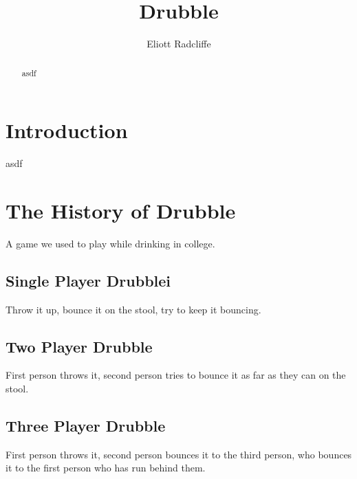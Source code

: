\documentclass{amsart}
\numberwithin{equation}{section}
\begin{document}
\title{Drubble}

\author{Eliott Radcliffe}



\begin{abstract}
asdf
\end{abstract}

\maketitle

\section{Introduction}
asdf

\section{The History of Drubble}
A game we used to play while drinking in college.

\subsection{Single Player Drubblei}
Throw it up, bounce it on the stool, try to keep it bouncing.

\subsection{Two Player Drubble}
First person throws it, second person tries to bounce it as far as they can on the stool.

\subsection{Three Player Drubble}
First person throws it, second person bounces it to the third person, who bounces it to the first person who has run behind them.
\end{document}
